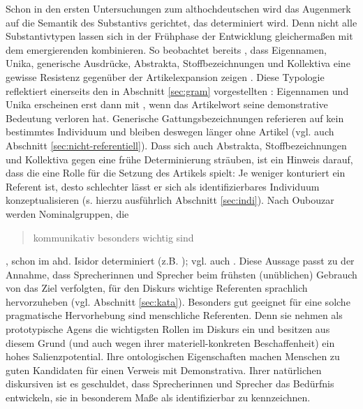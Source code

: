 Schon in den ersten Untersuchungen zum althochdeutschen  wird das Augenmerk auf die Semantik des Substantivs gerichtet, das determiniert wird. Denn nicht alle Substantivtypen lassen sich in der Frühphase der Entwicklung gleichermaßen mit dem emergierenden  kombinieren. So beobachtet bereits \textcite{Graf1905}, dass  Eigennamen,  Unika, generische  Ausdrücke,  Abstrakta, Stoffbezeichnungen und Kollektiva  eine gewisse Resistenz gegenüber der Artikelexpansion  zeigen \parencite[ähnlich][]{Bell1907, Hodler1954}. Diese Typologie reflektiert einerseits den in Abschnitt \ref{sec:gram} vorgestellten : Eigennamen  und Unika  erscheinen erst dann mit , wenn das Artikelwort seine demonstrative Bedeutung verloren hat. Generische Gattungsbezeichnungen referieren auf kein bestimmtes Individuum und bleiben deswegen länger ohne Artikel (vgl. auch Abschnitt \ref{sec:nicht-referentiell}). Dass sich auch  Abstrakta, Stoffbezeichnungen  und Kollektiva  gegen eine frühe Determinierung sträuben, ist ein Hinweis darauf, dass die  eine Rolle für die Setzung des Artikels spielt: Je weniger konturiert ein Referent ist, desto schlechter lässt er sich als identifizierbares Individuum konzeptualisieren (s. hierzu ausführlich Abschnitt \ref{sec:indi}). 
Nach Oubouzar werden Nominalgruppen, die \blockcquote[75]{Oubouzar1992}{kommunikativ besonders wichtig sind}, schon im ahd. Isidor determiniert (z.B.  ); vgl. auch \textcite[][117--118]{Oubouzar1989}.  
Diese Aussage passt zu der Annahme, dass Sprecherinnen  und Sprecher beim frühsten (unüblichen) Gebrauch von  das Ziel verfolgten, für den Diskurs wichtige Referenten sprachlich hervorzuheben (vgl. Abschnitt \ref{sec:kata}). 
Besonders gut geeignet für eine solche pragmatische Hervorhebung sind menschliche Referenten. Denn sie nehmen als prototypische Agens 
 die wichtigsten Rollen  im Diskurs ein und besitzen aus diesem Grund (und auch wegen ihrer materiell-konkreten Beschaffenheit) ein hohes Salienzpotential. Ihre ontologischen Eigenschaften machen Menschen zu guten Kandidaten für einen Verweis mit  Demonstrativa. Ihrer natürlichen diskursiven  ist es geschuldet, dass Sprecherinnen und Sprecher das Bedürfnis entwickeln, sie in besonderem Maße als identifizierbar zu kennzeichnen. 
